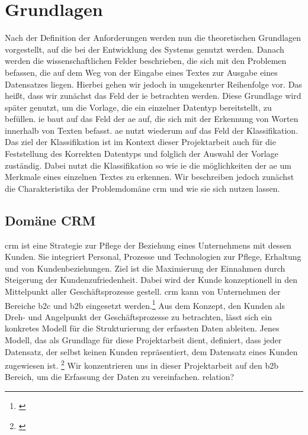 \chapter{Grundlagen}
Nach der Definition der Anforderungen werden nun die theoretischen Grundlagen vorgestellt, auf die bei der Entwicklung des Systems genutzt werden. Danach werden die wissenschaftlichen Felder beschrieben, die sich mit den Problemen befassen, die auf dem Weg von der Eingabe eines Textes zur Ausgabe eines Datensatzes liegen. Hierbei gehen wir jedoch in umgekenrter Reihenfolge vor. Das heißt, dass wir zunächst das Feld der \gls{ie} betrachten werden. Diese Grundlage wird später genutzt, um die Vorlage, die ein einzelner Datentyp bereitstellt, zu befüllen. \gls{ie} baut auf das Feld der \gls{ae} auf, die sich mit der Erkennung von Worten innerhalb von Texten befasst. \gls{ae} nutzt wiederum auf das Feld der Klassifikation. Das ziel der Klassifikation ist im Kontext dieser Projektarbeit auch für die Feststellung des Korrekten Datentyps und folglich der Auswahl der Vorlage zuständig. Dabei nutzt die Klassifikation so wie \gls{ie} die möglichkeiten der \gls{ae} um Merkmale eines einzelnen Textes zu erkennen. Wir beschreiben jedoch zunächst die Charakteristika der Problemdomäne \gls{crm} und wie sie sich nutzen lassen.


\section{Domäne CRM}
\gls{crm} ist eine Strategie zur Pflege der Beziehung eines Unternehmens mit dessen Kunden. Sie integriert Personal, Prozesse und Technologien zur Pflege, Erhaltung und von Kundenbeziehungen. Ziel ist die Maximierung der Einnahmen durch Steigerung der Kundenzufriedenheit. Dabei wird der Kunde konzeptionell in den Mittelpunkt aller Geschäftsprozesse gestell. \gls{crm} kann von Unternehmen der Bereiche \gls{b2c} und \gls{b2b} eingesetzt werden.\footnote{\cite{chen2003understanding}} Aus dem Konzept, den Kunden als Dreh- und Angelpunkt der Geschäftsprozesse zu betrachten, lässt sich ein konkretes Modell für die Strukturierung der erfassten Daten ableiten. Jenes Modell, das als Grundlage für diese Projektarbeit dient, definiert, dass jeder Datensatz, der selbst keinen Kunden repräsentiert, dem Datensatz eines Kunden zugewiesen ist. \footnote{\cite{puckey2001modeling}} Wir konzentrieren uns in dieser Projektarbeit auf den \gls{b2b} Bereich, um die Erfassung der Daten zu vereinfachen.
relation?

